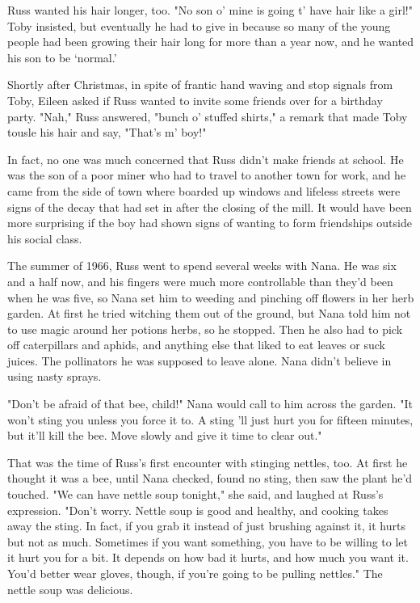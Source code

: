 Russ wanted his hair longer, too. "No son o' mine is going t' have hair like a girl!" Toby insisted, but eventually he had to give in because so many of the young people had been growing their hair long for more than a year now, and he wanted his son to be `normal.'

Shortly after Christmas, in spite of frantic hand waving and stop signals from Toby, Eileen asked if Russ wanted to invite some friends over for a birthday party. "Nah," Russ answered, "bunch o' stuffed shirts," a remark that made Toby tousle his hair and say, "That's m' boy!"

In fact, no one was much concerned that Russ didn't make friends at school. He was the son of a poor miner who had to travel to another town for work, and he came from the side of town where boarded up windows and lifeless streets were signs of the decay that had set in after the closing of the mill. It would have been more surprising if the boy had shown signs of wanting to form friendships outside his social class.

The summer of 1966, Russ went to spend several weeks with Nana. He was six and a half now, and his fingers were much more controllable than they'd been when he was five, so Nana set him to weeding and pinching off flowers in her herb garden. At first he tried witching them out of the ground, but Nana told him not to use magic around her potions herbs, so he stopped. Then he also had to pick off caterpillars and aphids, and anything else that liked to eat leaves or suck juices. The pollinators he was supposed to leave alone. Nana didn't believe in using nasty sprays.

"Don't be afraid of that bee, child!" Nana would call to him across the garden. "It won't sting you unless you force it to. A sting 'll just hurt you for fifteen minutes, but it'll kill the bee. Move slowly and give it time to clear out."

That was the time of Russ's first encounter with stinging nettles, too. At first he thought it was a bee, until Nana checked, found no sting, then saw the plant he'd touched. "We can have nettle soup tonight," she said, and laughed at Russ's expression. "Don't worry. Nettle soup is good and healthy, and cooking takes away the sting. In fact, if you grab it instead of just brushing against it, it hurts but not as much. Sometimes if you want something, you have to be willing to let it hurt you for a bit. It depends on how bad it hurts, and how much you want it. You'd better wear gloves, though, if you're going to be pulling nettles." The nettle soup was delicious.

